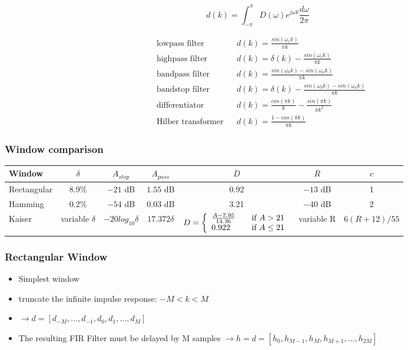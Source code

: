 \begin{equation}
d(k) = \int_{-\pi}^{\pi}D(\omega) e^{j\omega k}\frac{d\omega}{2\pi} \label{eq:impresp}
\end{equation}

\begin{align*}
&\text{lowpass filter} && d(k) = \frac{sin(\omega_ck)}{\pi k} \\
&\text{highpass filter} && d(k) = \delta(k) - \frac{sin(\omega_ck)}{\pi k} \\
&\text{bandpass filter} && d(k) = \frac{sin(\omega_bk) -sin(\omega_ak)}{\pi k} \\
&\text{bandstop filter} && d(k) = \delta(k) - \frac{sin(\omega_bk) -sin(\omega_ak)}{\pi k} \\
&\text{differentiator} && d(k) = \frac{cos(\pi k)}{k}-\frac{sin(\pi k)}{\pi k^2}\\
&\text{Hilber transformer} && d(k) = \frac{1-cos(\pi k)}{\pi k}
\end{align*}

\subsubsection{Window comparison}
\begin{tabular}{|l|c|c|c|c|c|c|}
	\hline
	Window & $\delta$ & $A_{stop}$ & $A_{pass}$ & $D$ & $R$ & $c$ \\
	\hline
	Rectangular & 8.9\% & $-21$ dB & $1.55$ dB & 0.92 & $-13$ dB & 1\\
	Hamming & 0.2\% & $-54$ dB & $0.03$ dB & 3.21 & $-40$ dB & 2\\
	Kaiser & variable $\delta$ & $-20log_{10}\delta$ & $17.372\delta$ & $D = \left\{
						\begin{array}{l l}
							\frac{A-7.95}{14.36}& \quad \text{if } A>21\\
							0.922 & \quad \text{if } A \leq 21
						\end{array} \right.$ & variable R & $6(R+12)/55$\\
	\hline
\end{tabular}

\subsubsection{Rectangular Window}
\begin{itemize}
	\item Simplest window
	\item truncate the infinite impulse response: $-M < k < M$
	\item $\rightarrow d = [d_{-M}, ..., d_{-1}, d_0, d_1, ..., d_M]$
	\item The resulting FIR Filter must be delayed by M samples \newline
	$\rightarrow h = d = [h_0, h_{M-1}, h_M, h_{M+1}, ..., h_{2M}]$
\end{itemize}


